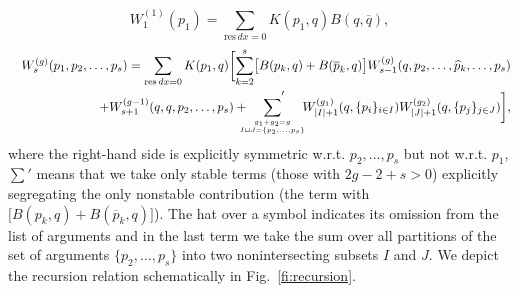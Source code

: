 \documentclass[11pt]{article}
\def\be{\begin{equation}}
\def\ee{\end{equation}}
\def\bea{\begin{eqnarray}}
\def\eea{\end{eqnarray}}
\def\bea{\begin{eqnarray}}
\def\eea{\end{eqnarray}}
\theoremstyle{plain}
\theoremstyle{definition}
\def\bea{\begin{eqnarray}}
\def\eea{\end{eqnarray}}
\begin{document}
\begin{itemize}
\be
W^{(1)}_1(p_1)=\sum_{\mathrm{res\,}dx=0} K(p_1,q)B(q,\overline q),
\label{W11}
\ee
\bea
&{}&W^{(g)}_s(p_1,p_2,\dots, p_s)=\sum_{\mathrm{res\,}dx=0} K(p_1,q)
\biggl[ \sum_{k=2}^s\bigl[B(p_k,q)+B(\overline p_k,q)\bigr]W^{(g)}_{s-1}(q,p_2,\dots, \widehat p_k,\dots, p_s)\biggr.\nonumber\\
&{}&\qquad\quad\biggl.
+W^{(g-1)}_{s+1}(q,q,p_2,\dots,p_s)+\hskip-0.3cm
\sum_{{g_1+g_2=g\atop I\sqcup J=\{p_2,\dots, p_s\}}}\hskip-0.8cm \biggm.^\prime \hskip 0.4cm
W^{(g_1)}_{|I|+1}(q,\{p_i\}_{i\in I}) W^{(g_2)}_{|J|+1}(q,\{p_j\}_{j\in J})\biggr],
\label{recursion}
\eea
where the right-hand side is explicitly symmetric w.r.t. $p_2,\dots, p_s$ but not w.r.t. $p_1$, $\sum'$ means that we take only stable terms (those
with $2g-2+s>0$) explicitly segregating the only nonstable contribution  (the term with $[B(p_k,q)+B(\overline p_k,q)\bigr]$). The hat over a
symbol indicates its omission from the list of arguments and in the last term we take the sum over all partitions of the set of arguments
$\{p_2,\dots,p_s\}$ into two nonintersecting subsets $I$ and $J$. We depict the recursion relation schematically in Fig.~\ref{fi:recursion}.
\end{itemize}
\end{document}
